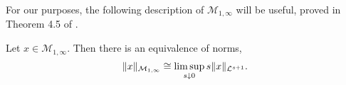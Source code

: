 For our purposes, the following description of $\mathcal{M}_{1,\infty}$ will
be useful, proved in Theorem 4.5 of \cite{CRSS}.
\begin{proposition}
    Let $x \in \mathcal{M}_{1,\infty}$. Then there is an equivalence of norms,
    \begin{equation}
        \|x\|_{\mathcal{M}_{1,\infty}} \cong \limsup_{s \downarrow 0} s\|x\|_{\mathcal{L}^{s+1}}.
    \end{equation}
\end{proposition}

